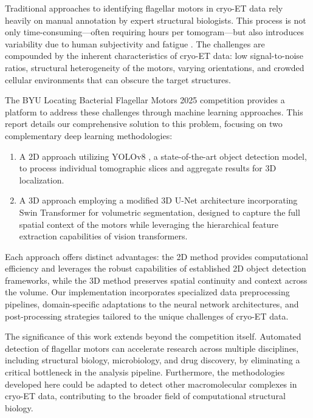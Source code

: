 \documentclass{article}
\begin{document}
Traditional approaches to identifying flagellar motors in cryo-ET data rely heavily on manual annotation by expert structural biologists. This process is not only time-consuming—often requiring hours per tomogram—but also introduces variability due to human subjectivity and fatigue \cite{lucicCryoelectronTomographyChallenge2013}. The challenges are compounded by the inherent characteristics of cryo-ET data: low signal-to-noise ratios, structural heterogeneity of the motors, varying orientations, and crowded cellular environments that can obscure the target structures.

The BYU Locating Bacterial Flagellar Motors 2025 competition \cite{byu-locating-bacterial-flagellar-motors-2025} provides a platform to address these challenges through machine learning approaches. This report details our comprehensive solution to this problem, focusing on two complementary deep learning methodologies:

\begin{enumerate}
    \item A 2D approach utilizing YOLOv8 \cite{jocherUltralyticsYolov5V702022}, a state-of-the-art object detection model, to process individual tomographic slices and aggregate results for 3D localization.
    \item A 3D approach employing a modified 3D U-Net architecture incorporating Swin Transformer \cite{Hatamizadeh2022SwinUS}\cite{cicek3DUNetLearning2016} for volumetric segmentation, designed to capture the full spatial context of the motors while leveraging the hierarchical feature extraction capabilities of vision transformers.
\end{enumerate}

Each approach offers distinct advantages: the 2D method provides computational efficiency and leverages the robust capabilities of established 2D object detection frameworks, while the 3D method preserves spatial continuity and context across the volume. Our implementation incorporates specialized data preprocessing pipelines, domain-specific adaptations to the neural network architectures, and post-processing strategies tailored to the unique challenges of cryo-ET data.

The significance of this work extends beyond the competition itself. Automated detection of flagellar motors can accelerate research across multiple disciplines, including structural biology, microbiology, and drug discovery, by eliminating a critical bottleneck in the analysis pipeline. Furthermore, the methodologies developed here could be adapted to detect other macromolecular complexes in cryo-ET data, contributing to the broader field of computational structural biology.
\end{document}
